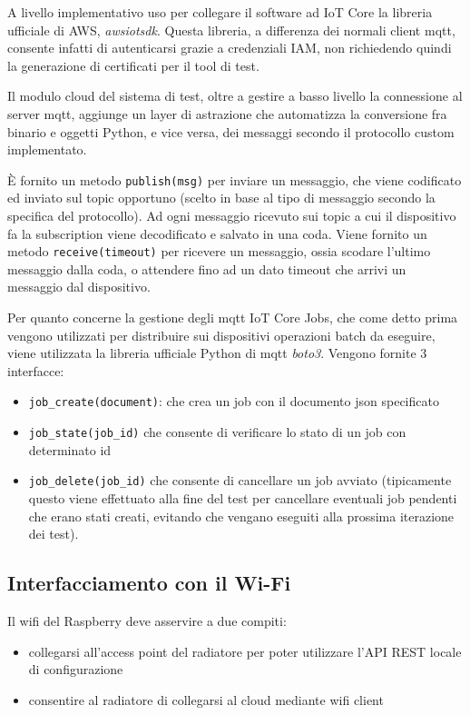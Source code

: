 \documentclass[12pt,a4paper,twoside,titlepage]{book}
\begin{document}
A livello implementativo uso per collegare il software ad IoT Core
la libreria ufficiale di AWS, \textit{awsiotsdk}. Questa libreria, a differenza dei
normali client \Gls{mqtt}, consente infatti di autenticarsi grazie a credenziali IAM, non
richiedendo quindi la generazione di certificati per il tool di test.

Il modulo cloud del sistema di test, oltre a gestire a basso livello la connessione
al server \Gls{mqtt}, aggiunge un layer di astrazione che automatizza la conversione fra
binario e oggetti Python, e vice versa, dei messaggi secondo il protocollo custom
implementato.

È fornito un metodo \texttt{publish(msg)} per inviare un messaggio, che viene codificato ed
inviato sul \gls{topic} opportuno (scelto in base al tipo di messaggio secondo la specifica
del protocollo). Ad ogni messaggio ricevuto sui \gls{topic} a cui il dispositivo fa la
subscription viene decodificato e salvato in una coda. Viene fornito un metodo \texttt{receive(timeout)}
per ricevere un messaggio, ossia scodare l'ultimo messaggio dalla coda, o attendere
fino ad un dato timeout che arrivi un messaggio dal dispositivo.

Per quanto concerne la gestione degli \Gls{mqtt} IoT Core Jobs, che come detto prima vengono
utilizzati per distribuire sui dispositivi operazioni batch da eseguire, viene
utilizzata la libreria ufficiale Python di \Gls{mqtt} \textit{boto3}. Vengono fornite
3 interfacce:
\begin{itemize}
    \item \texttt{job\_create(document)}: che crea un job con il documento \acrshort{json} specificato
    \item \texttt{job\_state(job\_id)} che consente di verificare lo stato di un job con determinato id
    \item \texttt{job\_delete(job\_id)} che consente di cancellare un job avviato (tipicamente
        questo viene effettuato alla fine del test per cancellare eventuali job pendenti che
        erano stati creati, evitando che vengano eseguiti alla prossima iterazione dei test).
\end{itemize}

\subsection{Interfacciamento con il Wi-Fi}

Il \Gls{wifi} del Raspberry deve asservire a due compiti:
\begin{itemize}
    \item collegarsi all'access point del radiatore per poter utilizzare l'API REST locale di configurazione
    \item consentire al radiatore di collegarsi al cloud mediante \Gls{wifi} client
\end{itemize}
\end{document}
